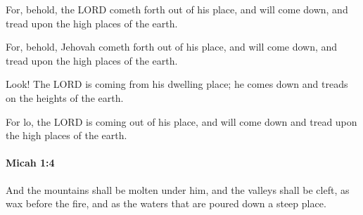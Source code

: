 			For, behold, the LORD cometh forth out of his place, and will come down, and tread upon the high places of the earth.

			\begin{versebox}
					\item[BHS] 
					\item[LXX] 
					\item[ASV] For, behold, Jehovah cometh forth out of his place, and will come down, and tread upon the high places of the earth.
					\item[NIV] Look! The LORD is coming from his dwelling place; he comes down and treads on the heights of the earth.
					\item[NRSV] For lo, the LORD is coming out of his place, and will come down and tread upon the high places of the earth.
			\end{versebox}

		\paragraph{Micah 1:4} %
			\label{MICAH-1-4}

			And the mountains shall be molten under him, and the valleys shall be cleft, as wax before the fire, and as the waters that are poured down a steep place.

